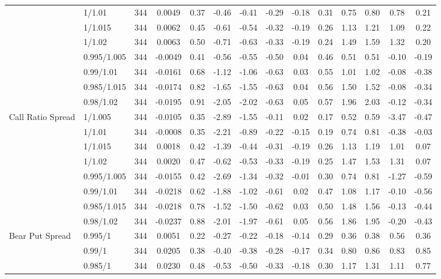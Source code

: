 \begin{tabular}{llcccccccccccc}
 & 1/1.01 & 344 & 0.0049 & 0.37 & -0.46 & -0.41 & -0.29 & -0.18 & 0.31 & 0.75 & 0.80 & 0.78 & 0.21 \\
 & 1/1.015 & 344 & 0.0062 & 0.45 & -0.61 & -0.54 & -0.32 & -0.19 & 0.26 & 1.13 & 1.21 & 1.09 & 0.22 \\
 & 1/1.02 & 344 & 0.0063 & 0.50 & -0.71 & -0.63 & -0.33 & -0.19 & 0.24 & 1.49 & 1.59 & 1.32 & 0.20 \\
 & 0.995/1.005 & 344 & -0.0049 & 0.41 & -0.56 & -0.55 & -0.50 & 0.04 & 0.46 & 0.51 & 0.51 & -0.10 & -0.19 \\
 & 0.99/1.01 & 344 & -0.0161 & 0.68 & -1.12 & -1.06 & -0.63 & 0.03 & 0.55 & 1.01 & 1.02 & -0.08 & -0.38 \\
 & 0.985/1.015 & 344 & -0.0174 & 0.82 & -1.65 & -1.55 & -0.63 & 0.04 & 0.56 & 1.50 & 1.52 & -0.08 & -0.34 \\
 & 0.98/1.02 & 344 & -0.0195 & 0.91 & -2.05 & -2.02 & -0.63 & 0.05 & 0.57 & 1.96 & 2.03 & -0.12 & -0.34 \\
Call Ratio Spread & 1/1.005 & 344 & -0.0105 & 0.35 & -2.89 & -1.55 & -0.11 & 0.02 & 0.17 & 0.52 & 0.59 & -3.47 & -0.47 \\
 & 1/1.01 & 344 & -0.0008 & 0.35 & -2.21 & -0.89 & -0.22 & -0.15 & 0.19 & 0.74 & 0.81 & -0.38 & -0.03 \\
 & 1/1.015 & 344 & 0.0018 & 0.42 & -1.39 & -0.44 & -0.31 & -0.19 & 0.26 & 1.13 & 1.19 & 1.01 & 0.07 \\
 & 1/1.02 & 344 & 0.0020 & 0.47 & -0.62 & -0.53 & -0.33 & -0.19 & 0.25 & 1.47 & 1.53 & 1.31 & 0.07 \\
 & 0.995/1.005 & 344 & -0.0155 & 0.42 & -2.69 & -1.34 & -0.32 & -0.01 & 0.30 & 0.74 & 0.81 & -1.27 & -0.59 \\
 & 0.99/1.01 & 344 & -0.0218 & 0.62 & -1.88 & -1.02 & -0.61 & 0.02 & 0.47 & 1.08 & 1.17 & -0.10 & -0.56 \\
 & 0.985/1.015 & 344 & -0.0218 & 0.78 & -1.52 & -1.50 & -0.62 & 0.03 & 0.50 & 1.48 & 1.56 & -0.13 & -0.44 \\
 & 0.98/1.02 & 344 & -0.0237 & 0.88 & -2.01 & -1.97 & -0.61 & 0.05 & 0.56 & 1.86 & 1.95 & -0.20 & -0.43 \\
Bear Put Spread & 0.995/1 & 344 & 0.0051 & 0.22 & -0.27 & -0.22 & -0.18 & -0.14 & 0.29 & 0.36 & 0.38 & 0.56 & 0.36 \\
 & 0.99/1 & 344 & 0.0205 & 0.38 & -0.40 & -0.38 & -0.28 & -0.17 & 0.34 & 0.80 & 0.86 & 0.83 & 0.85 \\
 & 0.985/1 & 344 & 0.0230 & 0.48 & -0.53 & -0.50 & -0.33 & -0.18 & 0.30 & 1.17 & 1.31 & 1.11 & 0.77 \\

\end{tabular}
